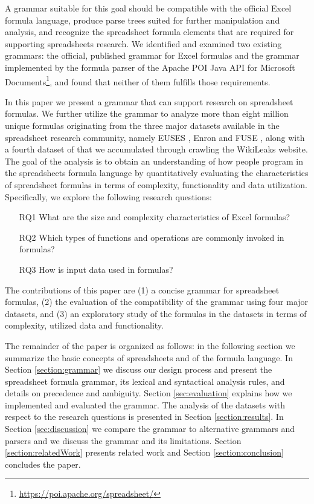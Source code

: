 \documentclass[times]{smrauth}
\begin{document}
A grammar suitable for this goal should be compatible with the official Excel formula language, produce parse trees suited for further manipulation and analysis, and recognize the spreadsheet formula elements that are required for supporting spreadsheets research. We identified and examined two existing grammars: the official, published grammar for Excel formulas \cite{ExcelOfficialGrammar} and the grammar implemented by the formula parser of the Apache POI Java API for Microsoft Documents\footnote{\url{https://poi.apache.org/spreadsheet/}}, and found that neither of them fulfills those requirements.

In this paper we present a grammar that can support research on spreadsheet formulas. We further utilize the grammar to analyze more than eight million unique formulas originating from the three major datasets available in the spreadsheet research community, namely EUSES \cite{euses}, Enron \cite{enron} and FUSE \cite{fuse}, along with a fourth dataset of that we accumulated through crawling the WikiLeaks website.  The goal of the analysis is to obtain an understanding of how people program in the spreadsheets formula language by quantitatively evaluating the characteristics of spreadsheet formulas in terms of complexity, functionality and data utilization. Specifically, we explore the following research questions:

\begin{itemize}
	\item[RQ1] What are the size and complexity characteristics of Excel formulas?
	\item[RQ2] Which types of functions and operations are commonly invoked in formulas?
	\item[RQ3] How is input data used in formulas?
\end{itemize}


The contributions of this paper are (1) a concise grammar for spreadsheet formulas, (2) the evaluation of the compatibility of the grammar using four major datasets, and (3) an exploratory study of the formulas in the datasets in terms of complexity, utilized data and functionality.

The remainder of the paper is organized as follows: in the following section we summarize the basic concepts of spreadsheets and of the formula language. In Section \ref{section:grammar} we discuss our design process and present the spreadsheet formula grammar, its lexical and syntactical analysis rules, and details on precedence and ambiguity. Section \ref{sec:evaluation} explains how we implemented and evaluated the grammar. The analysis of the datasets with respect to the research questions is presented in Section \ref{section:results}. In Section \ref{sec:discussion} we compare the grammar to alternative grammars and parsers and we discuss the grammar and its limitations. Section \ref{section:relatedWork} presents related work and Section \ref{section:conclusion} concludes the paper.
\end{document}

